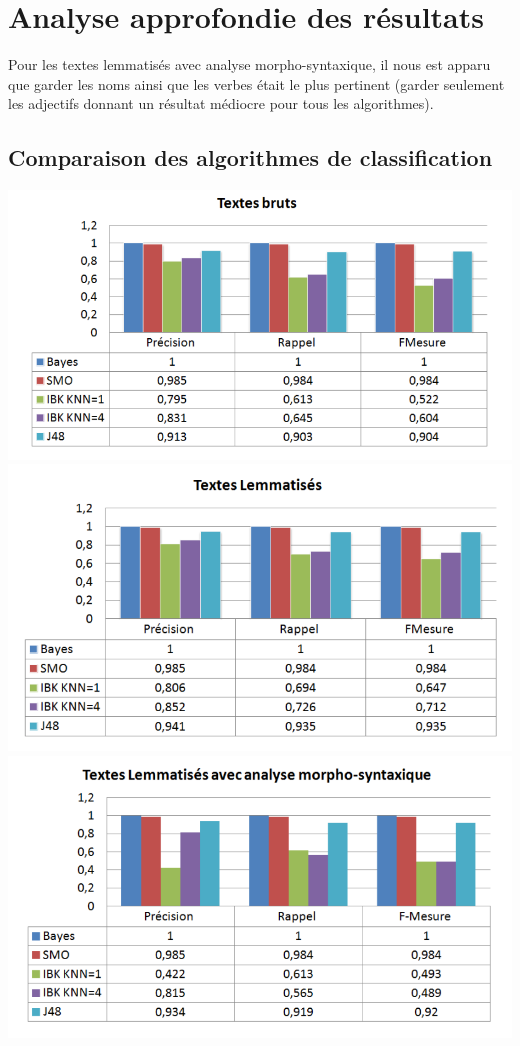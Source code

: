 \documentclass[a4paper,11pt]{article}
\begin{document}
\newpage
\section{Analyse approfondie des résultats}

Pour les textes lemmatisés avec analyse morpho-syntaxique, il nous est apparu que garder les noms ainsi que les verbes était le plus pertinent (garder seulement les adjectifs donnant un résultat médiocre pour tous les algorithmes).

\subsection{Comparaison des algorithmes de classification}

\begin{center}
\includegraphics[scale=0.4]{comp1.png}\\
\includegraphics[scale=0.4]{comp2.png}\\
\includegraphics[scale=0.4]{comp3.png}
\end{center}
\end{document}
